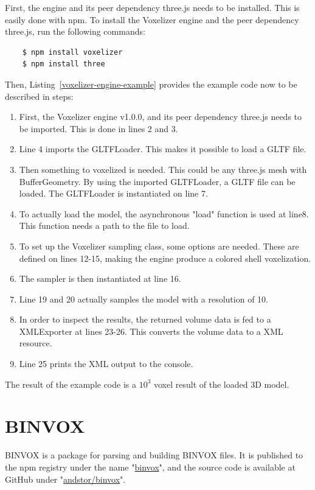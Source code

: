 First, the engine and its peer dependency three.js needs to be installed. This is easily done with npm. To install the Voxelizer engine and the peer dependency three.js, run the following commands:
\begin{verbatim}
    $ npm install voxelizer
    $ npm install three
\end{verbatim}
Then, Listing~\ref{voxelizer-engine-example} provides the example code now to be described in steps: 
\begin{enumerate}
    \item First, the Voxelizer engine v1.0.0, and its peer dependency three.js needs to be imported. This is done in lines 2 and 3.
    \item Line 4 imports the GLTFLoader. This makes it possible to load a GLTF file.
    \item Then something to voxelized is needed. This could be any three.js mesh with BufferGeometry. By using the imported GLTFLoader, a GLTF file can be loaded. The GLTFLoader is instantiated on line 7.
    \item To actually load the model, the asynchronous "load" function is used at line8. This function needs a path to the file to load.
    \item To set up the Voxelizer sampling class, some options are needed. These are defined on lines 12-15, making the engine produce a colored shell voxelization.
    \item The sampler is then instantiated at line 16.
    \item Line 19 and 20 actually samples the model with a resolution of 10.
    \item In order to inspect the results, the returned volume data is fed to a XMLExporter at lines 23-26. This converts the volume data to a XML resource.
    \item Line 25 prints the XML output to the console.
\end{enumerate}
The result of the example code is a $10^3$ voxel result of the loaded 3D model.


\clearpage

\section{BINVOX}
BINVOX is a package for parsing and building BINVOX files. It is published to the npm registry under the name "\href{https://www.npmjs.com/package/binvox}{binvox}", and the source code is available at GitHub under "\href{https://github.com/andstor/binvox}{andstor/binvox}".

